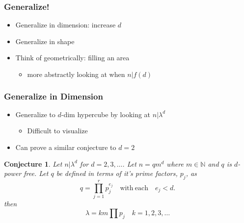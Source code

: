 \documentclass{beamer}
\theoremstyle{mydef}
\newtheorem{conj}{Conjecture}[section]
\begin{document}
\frame
{
\frametitle{Generalize!}

  \begin{itemize}
  \item Generalize in dimension: increase $d$
  \item Generalize in shape
  \item Think of geometrically: filling an area
  \begin{itemize}
  \item more abstractly looking at when $n \vert f(d)$
  \end{itemize}
  \end{itemize}
}

\frame
{
 \frametitle{Generalize in Dimension}
  \begin{itemize}
  \item Generalize to $d$-dim hypercube by looking at $n \vert \lambda^d$
  \begin{itemize}
  \item Difficult to visualize
      \end{itemize}

  \item Can prove a similar conjecture to $d=2$
   \end{itemize}
  \begin{conj}
Let $n\vert \lambda^d$ for $d=2, 3, \ldots$. Let $n = qm^d$ where $m \in \mathbb{N}$ and $q$ is $d$-power 
free. Let $q$ be defined in terms of it's prime factors, $p_j$, as
\[
	q = \prod\limits_{j=1}^{r} p_j^{e_j}\quad \text{with}\ \text{each}\quad e_j < d.
\]
then
\[
	\lambda = k m \prod p_j \quad k = 1, 2, 3, \ldots
\]
\end{conj}
}
\end{document}

